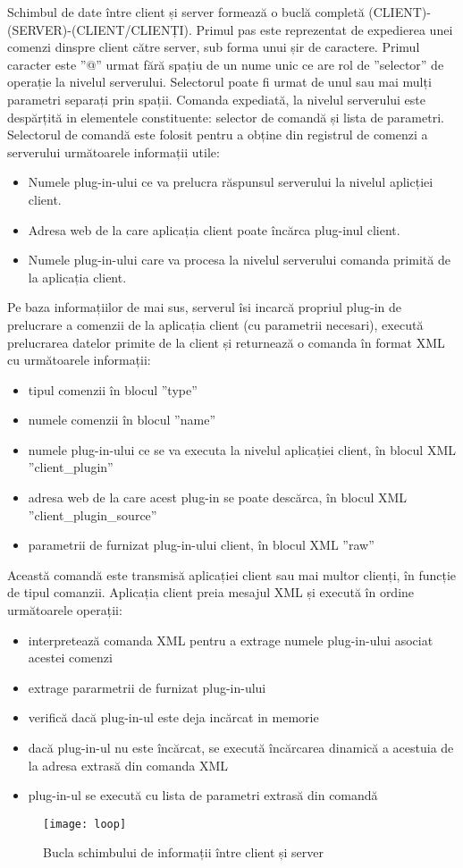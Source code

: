 \par Schimbul de date între client și server formează o buclă completă (CLIENT)-(SERVER)-(CLIENT/CLIENȚI). 
Primul pas este reprezentat de expedierea unei comenzi dinspre client către server, sub forma unui șir de caractere. Primul caracter este ”@” urmat fără spațiu de un nume unic ce are rol de ”selector” de operație la nivelul serverului. Selectorul poate fi urmat de unul sau mai mulți parametri separați prin spații. Comanda expediată, la nivelul serverului este despărțită in elementele constituente: selector de comandă și lista de parametri. Selectorul de comandă este folosit pentru a obține din registrul de comenzi a serverului următoarele informații utile:
\begin{itemize}
\item Numele plug-in-ului ce va prelucra răspunsul serverului la nivelul aplicției client.
\item Adresa web de la care aplicația client poate încărca plug-inul client.
\item Numele plug-in-ului care va procesa la nivelul serverului comanda primită de la aplicația client.
\end{itemize}
Pe baza informațiilor de mai sus, serverul îsi incarcă propriul plug-in de prelucrare a comenzii de la aplicația client (cu parametrii necesari), execută prelucrarea datelor primite de la client și returnează o comanda în format XML cu următoarele informații:

\begin{itemize}
\item tipul comenzii în blocul ”type”
\item numele comenzii în blocul ”name”
\item numele plug-in-ului ce se va executa la nivelul aplicației client, în blocul XML ”client\_plugin”
\item adresa web de la care acest plug-in se poate descărca, în blocul XML ”client\_plugin\_source”
\item parametrii de furnizat plug-in-ului client, în blocul XML ”raw”
\end{itemize}
Această comandă este transmisă aplicației client sau mai multor clienți, în funcție de tipul comanzii. Aplicația client preia mesajul XML și execută în ordine următoarele operații:

\begin{itemize}
\item interpretează comanda XML pentru a extrage numele plug-in-ului asociat acestei comenzi
\item extrage pararmetrii de furnizat plug-in-ului
\item verifică dacă plug-in-ul este deja incărcat in memorie 
\item dacă  plug-in-ul nu este încărcat, se execută încărcarea dinamică a acestuia de la adresa extrasă din comanda XML
\item plug-in-ul se execută cu lista de parametri extrasă din comandă
\end{itemize}

\begin{figure}[h]
    \centering
    \texttt{[image: loop]}
    \caption{Bucla schimbului de informații între client și server}
    \label{fig:loop}
\end{figure}